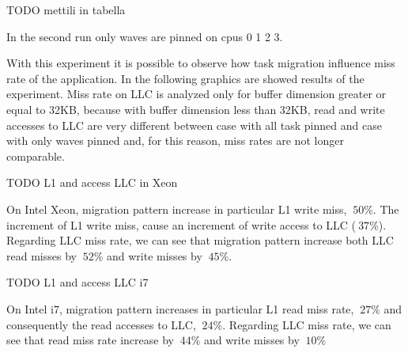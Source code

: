 TODO mettili in tabella


In the second run only waves are pinned on cpus 0 1 2 3. 

With this experiment it is possible to observe how task migration influence miss rate of the application. In the following graphics are showed results of 
the experiment. Miss rate on LLC is analyzed only for buffer dimension greater or equal to 32KB, because with buffer dimension less than 32KB, read and 
write accesses to LLC are very different between case with all task pinned and case with only waves pinned and, for this reason, miss rates are not longer 
comparable.

TODO L1 and access LLC in Xeon

On Intel Xeon, migration pattern increase in particular L1 write miss, $~ 50\%$. The increment of L1 write miss, cause an increment of write 
access to LLC ($~ 37\%$). Regarding LLC miss rate, we can see that migration pattern increase both LLC read misses by $~52\%$ and write misses by $~45\%$. 

TODO L1 and access LLC i7

On Intel i7, migration pattern increases in particular L1 read miss rate, $~27\%$ and consequently the read accesses to LLC, $~ 24\%$. Regarding LLC 
miss rate, we can see that read miss rate increase by $~ 44\%$ and write misses by $~10\%$

